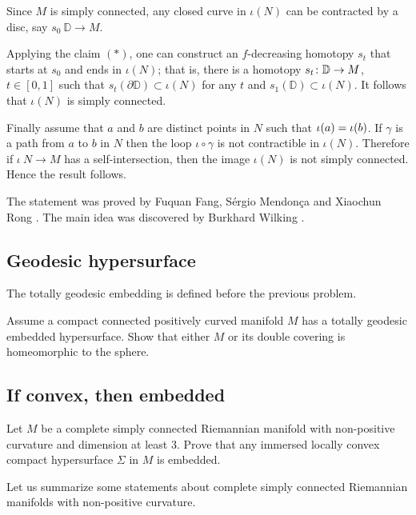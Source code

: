 Since $M$ is simply connected,
any closed curve in $\iota(N)$
can be contracted by a disc, say $s_0\:\mathbb D\to M$.

Applying the claim $({*})$, one can construct an $f$-decreasing homotopy $s_t$ that starts at $s_0$ and ends in $\iota(N)$;
that is, there is 
a homotopy $s_t\:\mathbb D\z\to M$, $t\in [0,1]$ 
such that $s_t(\partial \mathbb D)\subset \iota(N)$ for any $t$ 
and $s_1(\mathbb D)\subset \iota(N)$.
It follows that $\iota(N)$ is simply connected.

Finally assume that $a$ and $b$ are distinct points in $N$ such that $\iota(a)\z=\iota(b)$.
If $\gamma$ is a path from $a$ to $b$ in $N$ then the loop $\iota\circ\gamma$ is not contractible in $\iota(N)$.
Therefore if $\iota\:N\to M$ has a self-intersection,
then the image
$\iota(N)$ is not simply connected.
Hence the result follows.\qeds


The statement was proved by 
Fuquan Fang, 
S\'ergio Mendon\c{c}a 
and Xiaochun Rong \cite{FMR}.
The main idea was discovered by 
Burkhard Wilking \cite{wilking-2003}.

\subsection*{Geodesic hypersurface}
\label{Geodesic hypersurface}

The totally geodesic embedding is defined before the previous problem.

\begin{pr}
Assume a compact connected positively curved manifold $M$ has a totally geodesic embedded hypersurface.
Show that either $M$ or its double covering is homeomorphic to the sphere.
\end{pr}

\subsection*{If convex, then embedded}
\label{If convex then embedded} 

\begin{pr}
Let $M$ be a complete simply connected Riemannian manifold 
with non-positive curvature 
and dimension at least $3$.
Prove that any immersed locally convex
compact hypersurface $\Sigma$ in $M$ is embedded.
\end{pr}

Let us summarize some statements about complete simply connected Riemannian manifolds 
with non-positive curvature.

